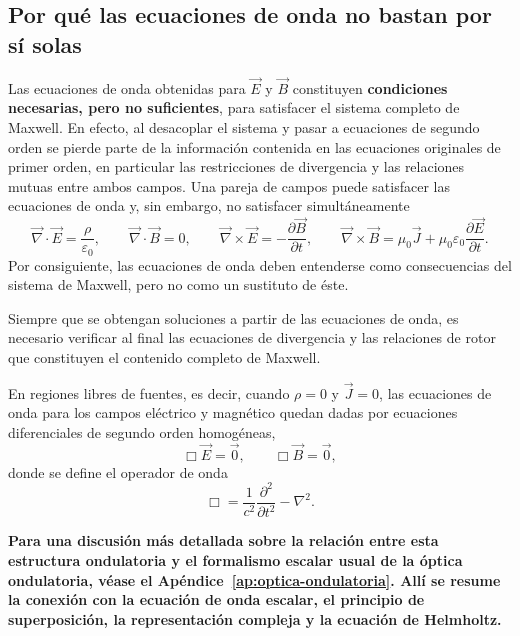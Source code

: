 \documentclass[12pt,a4paper]{article}
\theoremstyle{definition}
\theoremstyle{plain}
\numberwithin{equation}{section}
\theoremstyle{remark}
\newcommand{\E}{\vec{E}}
\newcommand{\B}{\vec{B}}
\newcommand{\J}{\vec{J}}
\begin{document}
\subsection{Por qué las ecuaciones de onda no bastan por sí solas}

Las ecuaciones de onda obtenidas para $\E$ y $\B$ constituyen \textbf{condiciones necesarias, pero no suficientes}, para satisfacer el sistema completo de Maxwell. En efecto, al desacoplar el sistema y pasar a ecuaciones de segundo orden se pierde parte de la información contenida en las ecuaciones originales de primer orden, en particular las restricciones de divergencia y las relaciones mutuas entre ambos campos. Una pareja de campos puede satisfacer las ecuaciones de onda y, sin embargo, no satisfacer simultáneamente
\begin{equation*}
    \vec\nabla\cdot\E=\frac{\rho}{\varepsilon_0},
    \qquad
    \vec\nabla\cdot\B=0,
    \qquad
    \vec\nabla\times\E=-\frac{\partial\B}{\partial t},
    \qquad
    \vec\nabla\times\B=\mu_0\J+\mu_0\varepsilon_0\frac{\partial\E}{\partial t}.
\end{equation*}
Por consiguiente, las ecuaciones de onda deben entenderse como consecuencias del sistema de Maxwell, pero no como un sustituto de éste.

\begin{cuidado}
Siempre que se obtengan soluciones a partir de las ecuaciones de onda, es necesario verificar al final las ecuaciones de divergencia y las relaciones de rotor que constituyen el contenido completo de Maxwell.
\end{cuidado}

En regiones libres de fuentes, es decir, cuando $\rho=0$ y $\vec J=0$, las ecuaciones de onda para los campos eléctrico y magnético quedan dadas por ecuaciones diferenciales de segundo orden homogéneas,
\begin{equation*}
    \Box\E=\vec 0,
    \qquad
    \Box\B=\vec 0,
\end{equation*}
donde se define el operador de onda
\begin{equation*}
    \Box=\frac{1}{c^2}\frac{\partial^2}{\partial t^2}-\nabla^2.
\end{equation*}





\textbf{Para una discusión más detallada sobre la relación entre esta estructura ondulatoria y el formalismo escalar usual de la óptica ondulatoria, véase el Apéndice~\ref{ap:optica-ondulatoria}. Allí se resume la conexión con la ecuación de onda escalar, el principio de superposición, la representación compleja y la ecuación de Helmholtz.}
\end{document}
